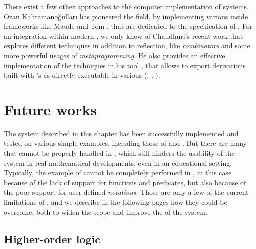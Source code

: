 \begin{remark}
  There exist a few other approaches to the computer implementation of  systems. Ozan Kahramanoğulları has pioneered the field, by
  implementing various  inside frameworks like Maude
  \cite{kahramanogullari_maude_2008} and Tom
  \cite{kahramanogullari_implementing_2005}, that are dedicated to the
  specification of . For an integration within modern
  , we only know of Chaudhuri's recent work
   that explores different techniques in
  addition to reflection, like \emph{combinators} and some more powerful usages
  of \emph{metaprogramming}. He also provides an effective implementation of the
  techniques in his  tool \cite{DBLP:conf/cade/Chaudhuri21}, that
  allows to export  derivations built with 's
   as  directly executable in various  (, , ).
\end{remark}

\section{Future works}

The  system described in this chapter has been successfully
implemented and tested on various simple examples, including those of
 and . But there are many   that
cannot be properly handled in , which still hinders the usability of
the system in real mathematical developments, even in an educational setting.
Typically, the example of  cannot be completely performed in
, in this case because of the lack of support for
\emph{} functions and predicates, but also because of the poor
support for user-defined \emph{notations}. Those are only a few of the current
limitations of , and we describe in the following pages how they
could be overcome, both to widen the scope and improve the  of the
system.

\subsection{Higher-order logic}

